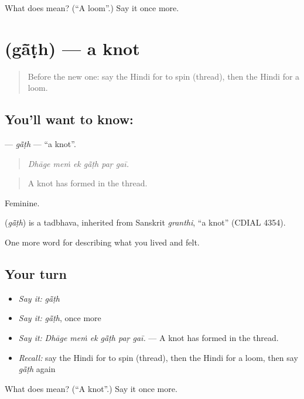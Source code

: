 \begin{tcolorbox}[breakable,colback=teal!4,colframe=teal!35!black,title={Before you move on}]
What does  mean? (\textquotedblleft{}A loom\textquotedblright{}.) Say it once more.
\end{tcolorbox}
\section[\texorpdfstring{\hi{गाँठ} (gā̃ṭh)}{गाँठ (gā̃ṭh)}]{ (gā̃ṭh) — a knot}

\label{lesson:HI-C512-gath}



\begin{quote}
Before the new one: say the Hindi for to spin (thread), then the Hindi for a loom.
\end{quote}

\subsection*{You'll want to know: }
\textbf{} — \emph{gā̃ṭh} — \textquotedblleft{}a knot\textquotedblright{}.

\begin{quote}
     
\end{quote}

\begin{quote}
\emph{Dhāge meṁ ek gā̃ṭh paṛ gaī.}
\end{quote}

\begin{quote}
A knot has formed in the thread.
\end{quote}

Feminine.

\begin{cousinweb}
\textbf{} (\emph{gā̃ṭh}) is a tadbhava, inherited from Sanskrit \emph{granthi}, \textquotedblleft{}a knot\textquotedblright{} (CDIAL 4354).
\end{cousinweb}

\begin{grammarlens}[title={What you've built}]
One more word for describing what you lived and felt.
\end{grammarlens}

\subsection*{Your turn}
\begin{itemize}
\raggedright
  \item \emph{Say it:} \emph{gā̃ṭh}
  \item \emph{Say it:} \emph{gā̃ṭh}, once more
  \item \emph{Say it:} \emph{Dhāge meṁ ek gā̃ṭh paṛ gaī.} — A knot has formed in the thread.
  \item \emph{Recall:} say the Hindi for to spin (thread), then the Hindi for a loom, then say \emph{gā̃ṭh} again
\end{itemize}

\begin{tcolorbox}[breakable,colback=teal!4,colframe=teal!35!black,title={Before you move on}]
What does  mean? (\textquotedblleft{}A knot\textquotedblright{}.) Say it once more.
\end{tcolorbox}

